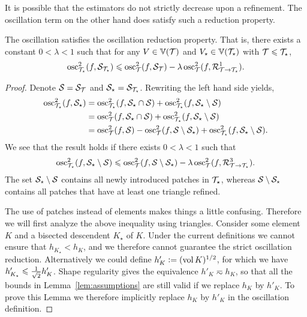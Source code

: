 \documentclass[thesis.tex]{subfiles}
\begin{document}
It is possible that the estimators do not strictly decrease upon a refinement. The oscillation term on the other hand does satisfy such a reduction property.
\begin{lem}
  \label{lem:oscasum}
  The oscillation satisfies the oscillation reduction property. That is, there exists a constant $0 < \lambda < 1$ such that for any $V \in \VV(\T)$ and $V_\star \in \VV(\T_\star)$ with $\T \leq \T_\star$,
  \[
    \osc_{\T_\star}^2(f, \W_{\T_\star}) \leq \osc^2_{\T}(f, \W_{\T}) - \lambda \osc^2_{\T}(f, \RR^1_{\T \to \T_\star}).
  \]
\end{lem}
\begin{proof}
  Denote $\W = \W_{\T}$ and $\W_\star = \W_{\T_\star}$. Rewriting the left hand side yields,
  \begin{align*}
    \osc_{\T_\star}^2(f, \W_\star) &= \osc^2_{\T_\star}(f, \W_\star \cap \W) + \osc^2_{\T_\star}(f, \W_\star \setminus \W)\\
    &= \osc^2_{\T}(f, \W_\star \cap \W) + \osc^2_{\T_\star}(f, \W_\star \setminus \W)\\
    &= \osc^2_{\T}(f, \W) - \osc^2_{\T}(f, \W \setminus \W_\star) + \osc_{\T_\star}^2(f, \W_\star \setminus \W).
  \end{align*}
  We see that the result holds if there exists $0 < \lambda < 1$ such that
  \begin{equation}
    \label{eq:blabla}
    \osc_{\T_\star}^2(f, \W_\star \setminus \W) \leq \osc_{\T}^2(f, \W\setminus \W_\star) - \lambda \osc_\T^2(f, \RR^3_{\T \to \T_\star}).
  \end{equation}
  The set $\W_\star \setminus \W$ contains all newly introduced patches in $\T_\star$, whereas $\W \setminus \W_\star$ contains
  all patches that have at least one triangle refined.

  The use of patches instead of elements makes things a little confusing.  
  Therefore we will first analyze the above inequality using triangles.
  Consider some element $K$ and a bisected descendent $K_\star$ of $K$. Under the current definitions
  we cannot ensure that $h_{K_\star} < h_K$, and we therefore cannot guarantee the strict oscillation reduction. 
  Alternatively we could define $h'_K := (\vol K)^{1/2}$, for which we have $h'_{K_\star} \leq {1\over\sqrt{2}} h'_K$. 
  Shape regularity gives the equivalence $h'_K \eqsim h_K$, so that all the bounds in Lemma~\ref{lem:assumptions} are still
  valid if we replace $h_K$ by $h'_K$. To prove this Lemma we therefore implicitly replace $h_K$ by
  $h'_K$ in the  oscillation definition.


\end{proof}
\end{document}
